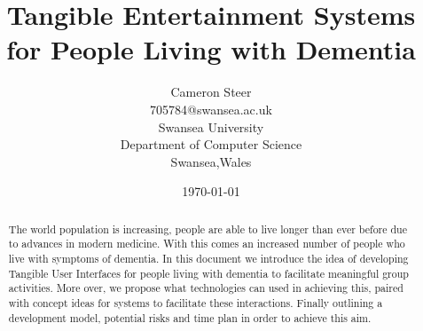 \documentclass[11pt, a4paper]{report}
\title{Tangible Entertainment Systems for People Living with Dementia}
\author {Cameron Steer\\
	705784@swansea.ac.uk\\
	Swansea University\\
	Department of Computer Science\\
	Swansea,Wales\\
	}
\date{\today}
\begin{document}
\maketitle
\thispagestyle{empty}
\begin{abstract}
\noindent The world population is increasing, people are able to live longer than ever before due to advances in modern medicine.
With this comes an increased number of people who live with symptoms of dementia. 
In this document we introduce the idea of developing Tangible User Interfaces for people living with dementia to facilitate meaningful group activities.
More over, we propose what technologies can used in achieving this, paired with concept ideas for systems to facilitate these interactions.
Finally outlining a development model, potential risks and time plan in order to achieve this aim.

\end{abstract}
\newpage
{}
\setcounter{page}{1}
\small
\tableofcontents
\normalsize
\newpage




\small


\newpage
\iffalse
\begin{appendices}
\section{Spark Core Notification Code}\label{notecube}




\section{Plant Game Code}\label{accCode}


\end{appendices}
\fi
\end{document}
